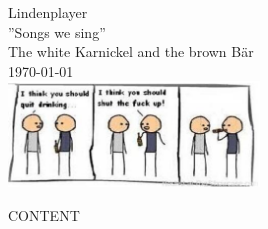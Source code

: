 \documentclass[10pt, a4paper,twoside]{report}
\begin{document}
\pagestyle{plain}
\begin{titlepage}
\center
{\Huge Lindenplayer}\\[0.5cm]
{\huge ''Songs we sing''}\\[1cm]
{\LARGE The white Karnickel and the brown B\"ar}\\[0.5cm]
{\large \today}\\[2cm] 
\includegraphics[width=0.5\textwidth]{shutTheFuckUp.ps}
\end{titlepage}


\tableofcontents

\pagestyle{plain}
CONTENT
\newpage
\printindex
\end{document}
